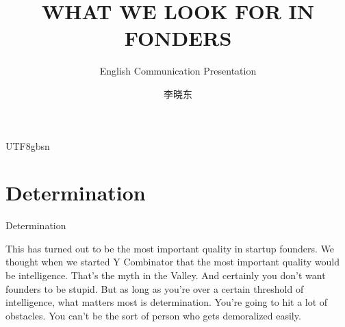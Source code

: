 \documentclass{beamer}
\begin{document}
\begin{CJK}{UTF8}{gbsn}
\title{WHAT WE LOOK FOR IN FONDERS}
\subtitle{English Communication Presentation}
\author{李晓东}
\renewcommand{\today}{ March 27, 2012}
\begin{frame}
  \titlepage
\end{frame}
\section{Determination}
\begin{frame}{Determination}
  \begin{block}{
This has turned out to be the most important quality in startup founders. We thought when we started Y Combinator that the most important quality would be intelligence. That's the myth in the Valley. And certainly you don't want founders to be stupid. But as long as you're over a certain threshold of intelligence, what matters most is determination. You're going to hit a lot of obstacles. You can't be the sort of person who gets demoralized easily.}
\end{block}
\end{frame}

\end{CJK}
\end{document}
